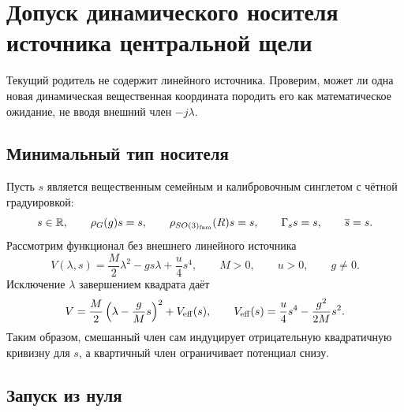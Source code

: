 \chapter{Допуск динамического носителя источника центральной щели}
\label{ch:v8-baryon-c0-singlet-triplet-central-gap-dynamical-source-carrier-admission-gate}

Текущий родитель не содержит линейного источника. Проверим, может ли одна
новая динамическая вещественная координата породить его как математическое
ожидание, не вводя внешний член $-j\lambda$.

\section{Минимальный тип носителя}

Пусть $s$ является вещественным семейным и калибровочным синглетом с
чётной градуировкой:
\begin{equation}
 s\in\mathbb R,
 \qquad \rho_G(g)s=s,
 \qquad \rho_{SO(3)_{\rm fam}}(R)s=s,
 \qquad \Gamma_s s=s,
 \qquad \overline s=s.
 \label{eq:v8-baryon-c0-dynamic-source-carrier-type}
\end{equation}
Рассмотрим функционал без внешнего линейного источника
\begin{equation}
 V(\lambda,s)=\frac M2\lambda^2-gs\lambda+\frac u4s^4,
 \qquad M>0,
 \qquad u>0,
 \qquad g\ne0.
 \label{eq:v8-baryon-c0-dynamic-source-parent}
\end{equation}
Исключение $\lambda$ завершением квадрата даёт
\begin{equation}
 V=\frac M2\left(\lambda-\frac gM s\right)^2
 +V_{\rm eff}(s),
 \qquad
 V_{\rm eff}(s)=\frac u4s^4-\frac{g^2}{2M}s^2.
 \label{eq:v8-baryon-c0-dynamic-source-effective-potential}
\end{equation}
Таким образом, смешанный член сам индуцирует отрицательную квадратичную
кривизну для $s$, а квартичный член ограничивает потенциал снизу.

\section{Запуск из нуля}

